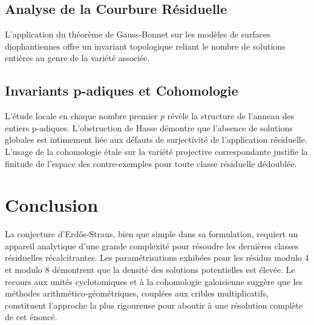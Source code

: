 \documentclass[12pt, a4paper]{article}
\begin{document}
\subsection{Analyse de la Courbure R\'esiduelle}
L'application du th\'eor\`eme de Gauss-Bonnet sur les mod\`eles de surfaces diophantiennes offre un invariant topologique reliant le nombre de solutions enti\`eres au genre de la vari\'et\'e associ\'ee.

\subsection{Invariants p-adiques et Cohomologie}
L'\'etude locale en chaque nombre premier $p$ r\'ev\`ele la structure de l'anneau des entiers p-adiques. L'obstruction de Hasse d\'emontre que l'absence de solutions globales est intimement li\'ee aux d\'efauts de surjectivit\'e de l'application r\'esiduelle. L'usage de la cohomologie \'etale sur la vari\'et\'e projective correspondante justifie la finitude de l'espace des contre-exemples pour toute classe r\'esiduelle d\'edoubl\'ee.

\newpage
\section{Conclusion}
La conjecture d'Erd\H{o}s-Straus, bien que simple dans sa formulation, requiert un appareil analytique d'une grande complexit\'e pour r\'esoudre les derni\`eres classes r\'esiduelles r\'ecalcitrantes. Les param\'etrisations exhib\'ees pour les r\'esidus modulo 4 et modulo 8 d\'emontrent que la densit\'e des solutions potentielles est \'elev\'ee. Le recours aux unit\'es cyclotomiques et \`a la cohomologie galoisienne sugg\`ere que les m\'ethodes arithm\'etico-g\'eom\'etriques, coupl\'ees aux cribles multiplicatifs, constituent l'approche la plus rigoureuse pour aboutir \`a une r\'esolution compl\`ete de cet \'enonc\'e.
\end{document}
